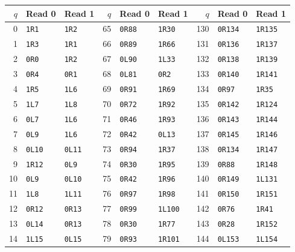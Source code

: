 {\scriptsize\renewcommand{\arraystretch}{0.88}
\begin{longtable}{@{}rll@{\hspace{1.8em}}rll@{\hspace{1.8em}}rll@{}}
\toprule $q$ & Read 0 & Read 1 & $q$ & Read 0 & Read 1 & $q$ & Read 0 & Read 1\\\midrule\endhead
0 & \texttt{1R1} & \texttt{1R2} & 65 & \texttt{0R88} & \texttt{1R30} & 130 & \texttt{0R134} & \texttt{1R135}\\
1 & \texttt{1R3} & \texttt{1R1} & 66 & \texttt{0R89} & \texttt{1R66} & 131 & \texttt{0R136} & \texttt{1R137}\\
2 & \texttt{0R0} & \texttt{1R2} & 67 & \texttt{0L90} & \texttt{1L33} & 132 & \texttt{0R138} & \texttt{1R139}\\
3 & \texttt{0R4} & \texttt{0R1} & 68 & \texttt{0L81} & \texttt{0R2} & 133 & \texttt{0R140} & \texttt{1R141}\\
4 & \texttt{1R5} & \texttt{1L6} & 69 & \texttt{0R91} & \texttt{1R69} & 134 & \texttt{0R97} & \texttt{1R35}\\
5 & \texttt{1L7} & \texttt{1L8} & 70 & \texttt{0R72} & \texttt{1R92} & 135 & \texttt{0R142} & \texttt{1R124}\\
6 & \texttt{0L7} & \texttt{1L6} & 71 & \texttt{0R46} & \texttt{1R93} & 136 & \texttt{0R143} & \texttt{1R144}\\
7 & \texttt{0L9} & \texttt{1L6} & 72 & \texttt{0R42} & \texttt{0L13} & 137 & \texttt{0R145} & \texttt{1R146}\\
8 & \texttt{0L10} & \texttt{0L11} & 73 & \texttt{0R94} & \texttt{1R37} & 138 & \texttt{0R134} & \texttt{1R147}\\
9 & \texttt{1R12} & \texttt{0L9} & 74 & \texttt{0R30} & \texttt{1R95} & 139 & \texttt{0R88} & \texttt{1R148}\\
10 & \texttt{0L9} & \texttt{0L10} & 75 & \texttt{0R42} & \texttt{1R96} & 140 & \texttt{0R149} & \texttt{1L131}\\
11 & \texttt{1L8} & \texttt{1L11} & 76 & \texttt{0R97} & \texttt{1R98} & 141 & \texttt{0R150} & \texttt{1R151}\\
12 & \texttt{0R12} & \texttt{0R13} & 77 & \texttt{0R99} & \texttt{1L100} & 142 & \texttt{0R76} & \texttt{1R41}\\
13 & \texttt{0L14} & \texttt{0R13} & 78 & \texttt{0R30} & \texttt{1R77} & 143 & \texttt{0R28} & \texttt{1R152}\\
14 & \texttt{1L15} & \texttt{0L15} & 79 & \texttt{0R93} & \texttt{1R101} & 144 & \texttt{0L153} & \texttt{1L154}\\

\end{longtable}}
